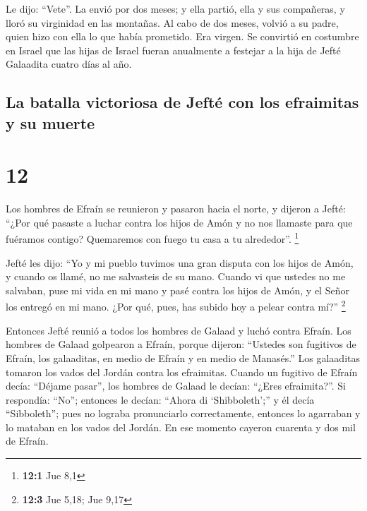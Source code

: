  Le dijo: ``Vete''. La envió por dos meses; y ella
partió, ella y sus compañeras, y lloró su virginidad en las montañas.
 Al cabo de dos meses, volvió a su padre, quien hizo con
ella lo que había prometido. Era virgen. Se convirtió en costumbre en
Israel  que las hijas de Israel fueran anualmente a
festejar a la hija de Jefté Galaadita cuatro días al año.

\hypertarget{la-batalla-victoriosa-de-jeftuxe9-con-los-efraimitas-y-su-muerte}{%
\subsection{La batalla victoriosa de Jefté con los efraimitas y su
muerte}\label{la-batalla-victoriosa-de-jeftuxe9-con-los-efraimitas-y-su-muerte}}

\hypertarget{section-11}{%
\section{12}\label{section-11}}

 Los hombres de Efraín se reunieron y pasaron hacia el
norte, y dijeron a Jefté: ``¿Por qué pasaste a luchar contra los hijos
de Amón y no nos llamaste para que fuéramos contigo? Quemaremos con
fuego tu casa a tu alrededor''. \footnote{\textbf{12:1} Jue 8,1}

 Jefté les dijo: ``Yo y mi pueblo tuvimos una gran disputa
con los hijos de Amón, y cuando os llamé, no me salvasteis de su mano.
 Cuando vi que ustedes no me salvaban, puse mi vida en mi
mano y pasé contra los hijos de Amón, y el Señor los entregó en mi mano.
¿Por qué, pues, has subido hoy a pelear contra mí?'' \footnote{\textbf{12:3}
  Jue 5,18; Jue 9,17}

 Entonces Jefté reunió a todos los hombres de Galaad y
luchó contra Efraín. Los hombres de Galaad golpearon a Efraín, porque
dijeron: ``Ustedes son fugitivos de Efraín, los galaaditas, en medio de
Efraín y en medio de Manasés.''  Los galaaditas tomaron
los vados del Jordán contra los efraimitas. Cuando un fugitivo de Efraín
decía: ``Déjame pasar'', los hombres de Galaad le decían: ``¿Eres
efraimita?''. Si respondía: ``No'';  entonces le decían:
``Ahora di `Shibboleth';'' y él decía ``Sibboleth''; pues no lograba
pronunciarlo correctamente, entonces lo agarraban y lo mataban en los
vados del Jordán. En ese momento cayeron cuarenta y dos mil de Efraín.

